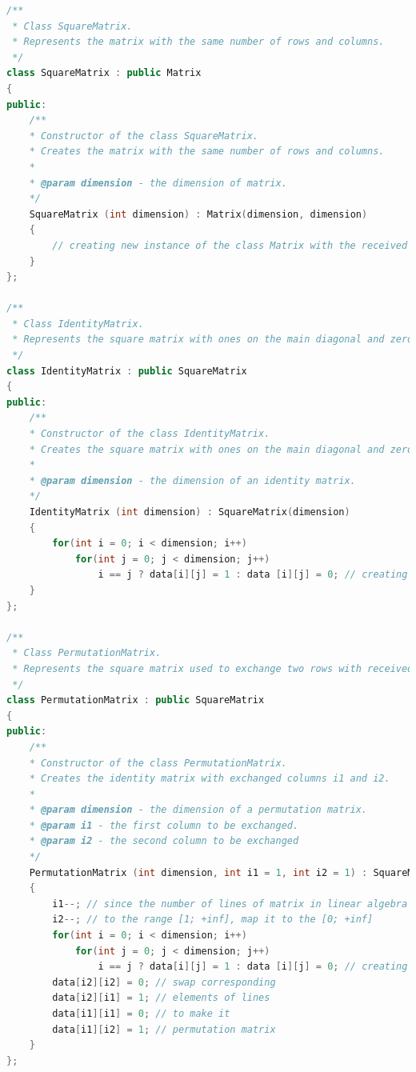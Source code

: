 \documentclass[11pt]{article}
\begin{document}
\begin{lstlisting}[language=C++, caption=Implementation of Least-squares approximation algorithm]
/**
 * Class SquareMatrix.
 * Represents the matrix with the same number of rows and columns.
 */
class SquareMatrix : public Matrix
{
public:
    /**
    * Constructor of the class SquareMatrix.
    * Creates the matrix with the same number of rows and columns.
    *
    * @param dimension - the dimension of matrix.
    */
    SquareMatrix (int dimension) : Matrix(dimension, dimension)
    {
        // creating new instance of the class Matrix with the received number of rows and columns
    }
};

/**
 * Class IdentityMatrix.
 * Represents the square matrix with ones on the main diagonal and zeros elsewhere.
 */
class IdentityMatrix : public SquareMatrix
{
public:
    /**
    * Constructor of the class IdentityMatrix.
    * Creates the square matrix with ones on the main diagonal and zeros elsewhere.
    *
    * @param dimension - the dimension of an identity matrix.
    */
    IdentityMatrix (int dimension) : SquareMatrix(dimension)
    {
        for(int i = 0; i < dimension; i++)
            for(int j = 0; j < dimension; j++)
                i == j ? data[i][j] = 1 : data [i][j] = 0; // creating the identity matrix, set the main diagonal elements to ones and fill the rest of matrix with zeroes
    }
};

/**
 * Class PermutationMatrix.
 * Represents the square matrix used to exchange two rows with received indexes of the matrix.
 */
class PermutationMatrix : public SquareMatrix
{
public:
    /**
    * Constructor of the class PermutationMatrix.
    * Creates the identity matrix with exchanged columns i1 and i2.
    *
    * @param dimension - the dimension of a permutation matrix.
    * @param i1 - the first column to be exchanged.
    * @param i2 - the second column to be exchanged
    */
    PermutationMatrix (int dimension, int i1 = 1, int i2 = 1) : SquareMatrix(dimension)
    {
        i1--; // since the number of lines of matrix in linear algebra belongs
        i2--; // to the range [1; +inf], map it to the [0; +inf]
        for(int i = 0; i < dimension; i++)
            for(int j = 0; j < dimension; j++)
                i == j ? data[i][j] = 1 : data [i][j] = 0; // creating the identity matrix, set the main diagonal elements to ones and fill the rest of matrix with zeroes
        data[i2][i2] = 0; // swap corresponding
        data[i2][i1] = 1; // elements of lines
        data[i1][i1] = 0; // to make it
        data[i1][i2] = 1; // permutation matrix
    }
};


\end{lstlisting}
\end{document}
